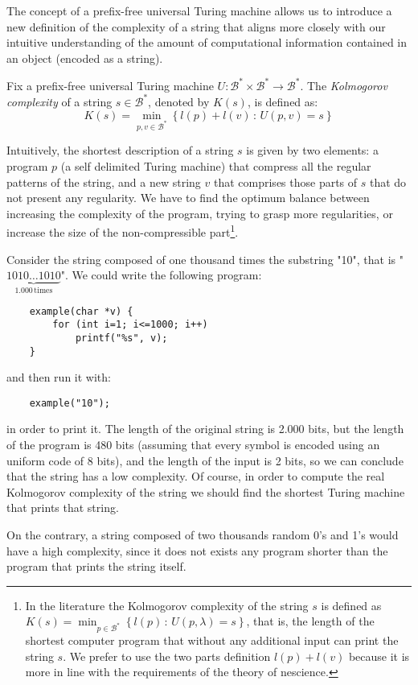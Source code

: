 The concept of a prefix-free universal Turing machine allows us to introduce a new definition of the complexity of a string that aligns more closely with our intuitive understanding of the amount of computational information contained in an object (encoded as a string).

\begin{definition}
\label{def:Kolmogorov-Complexity}
Fix a prefix-free universal Turing machine $U:\mathcal{B}^\ast \times \mathcal{B}^\ast \rightarrow \mathcal{B}^\ast$. The \emph{Kolmogorov complexity} of a string $s \in \mathcal{B}^\ast$, denoted by $K(s)$, is defined as:
\[
K(s)=\min_{p,v \in \mathcal{B}^\ast}\left\{l(p) + l(v)\,:\, U(p,v)=s\right\}
\]
\end{definition}

Intuitively, the shortest description of a string $s$ is given by two elements: a program $p$ (a self delimited Turing machine) that compress all the regular patterns of the string, and a new string $v$ that comprises those parts of $s$ that do not present any regularity. We have to find the optimum balance between increasing the complexity of the program, trying to grasp more regularities, or increase the size of the non-compressible part\footnote{In the literature the Kolmogorov complexity of the string $s$ is defined as $K(s)=\min_{p \in \mathcal{B}^\ast}\left\{l(p)\,:\, U(p,\lambda)=s\right\}$, that is, the length of the shortest computer program that without any additional input can print the string $s$. We prefer to use the two parts definition $l(p) + l(v)$ because it is more in line with the requirements of the theory of nescience.}.

\begin{example}
Consider the string composed of one thousand times the substring "10", that is "$\underbrace{1010\ldots1010}_{1.000\,\mathrm{times}}$". We could write the following program:

\begin{verbatim}
    example(char *v) {
        for (int i=1; i<=1000; i++)
            printf("%s", v);
    }
\end{verbatim}
and then run it with:
\begin{verbatim}
    example("10");
\end{verbatim}

in order to print it. The length of the original string is 2.000 bits, but the length of the program is 480 bits (assuming that every symbol is encoded using an uniform code of 8 bits), and the length of the input is 2 bits, so we can conclude that the string has a low complexity. Of course, in order to compute the real Kolmogorov complexity of the string we should find the shortest Turing machine that prints that string.

On the contrary, a string composed of two thousands random 0's and 1's would have a high complexity, since it does not exists any program shorter than the program that prints the string itself.
\end{example}

